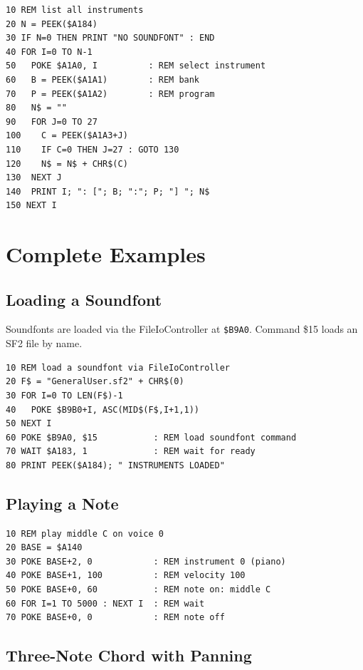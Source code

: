 \begin{lstlisting}
10 REM list all instruments
20 N = PEEK($A184)
30 IF N=0 THEN PRINT "NO SOUNDFONT" : END
40 FOR I=0 TO N-1
50   POKE $A1A0, I          : REM select instrument
60   B = PEEK($A1A1)        : REM bank
70   P = PEEK($A1A2)        : REM program
80   N$ = ""
90   FOR J=0 TO 27
100    C = PEEK($A1A3+J)
110    IF C=0 THEN J=27 : GOTO 130
120    N$ = N$ + CHR$(C)
130  NEXT J
140  PRINT I; ": ["; B; ":"; P; "] "; N$
150 NEXT I
\end{lstlisting}


\section{Complete Examples}
\label{sec:wts-examples}

\subsection{Loading a Soundfont}

Soundfonts are loaded via the FileIoController at \texttt{\$B9A0}.
Command \$15 loads an SF2 file by name.

\begin{lstlisting}
10 REM load a soundfont via FileIoController
20 F$ = "GeneralUser.sf2" + CHR$(0)
30 FOR I=0 TO LEN(F$)-1
40   POKE $B9B0+I, ASC(MID$(F$,I+1,1))
50 NEXT I
60 POKE $B9A0, $15           : REM load soundfont command
70 WAIT $A183, 1             : REM wait for ready
80 PRINT PEEK($A184); " INSTRUMENTS LOADED"
\end{lstlisting}

\subsection{Playing a Note}

\begin{lstlisting}
10 REM play middle C on voice 0
20 BASE = $A140
30 POKE BASE+2, 0            : REM instrument 0 (piano)
40 POKE BASE+1, 100          : REM velocity 100
50 POKE BASE+0, 60           : REM note on: middle C
60 FOR I=1 TO 5000 : NEXT I  : REM wait
70 POKE BASE+0, 0            : REM note off
\end{lstlisting}

\subsection{Three-Note Chord with Panning}

